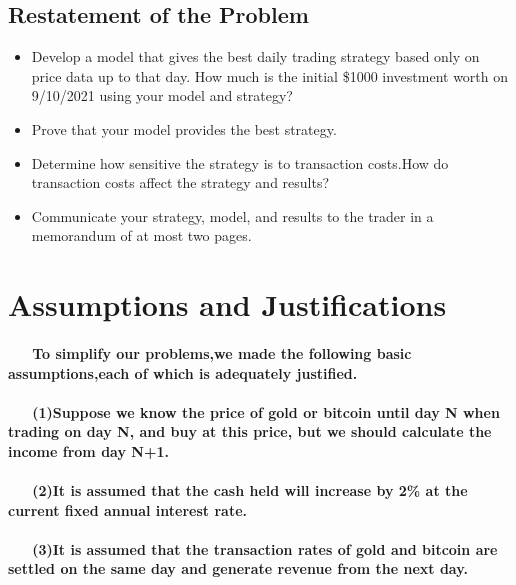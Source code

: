 \documentclass{mcmthesis}
\begin{document}
	
	\subsection{Restatement of the Problem}
	
	\begin{itemize}
		\item Develop a model that gives the best daily trading strategy based only on price data up 
		to that day. How much is the initial  \$1000 investment worth on 9/10/2021 using your 
		model and strategy?
		\item Prove that your model provides the best strategy.
		\item Determine how sensitive the strategy is to transaction costs.How do transaction costs
		affect the strategy and results?
		\item Communicate your strategy, model, and results to the trader in a memorandum of at most 
		two pages.
	\end{itemize}
	
	\section{Assumptions and Justifications}
	\paragraph{\ \ \ To simplify our problems,we made the following basic assumptions,each of which is adequately justified.}
	\paragraph{\ \ \ (1)Suppose we know the price of gold or bitcoin until day N when trading on day N, and buy at this price, but we should calculate the income from day N+1.}
	\paragraph{\ \ \ (2)It is assumed that the cash held will increase by 2\% at the current fixed annual interest rate.}
	\paragraph{\ \ \ (3)It is assumed that the transaction rates of gold and bitcoin are settled on the same day and generate revenue from the next day.}
	
	
	
\end{document}
